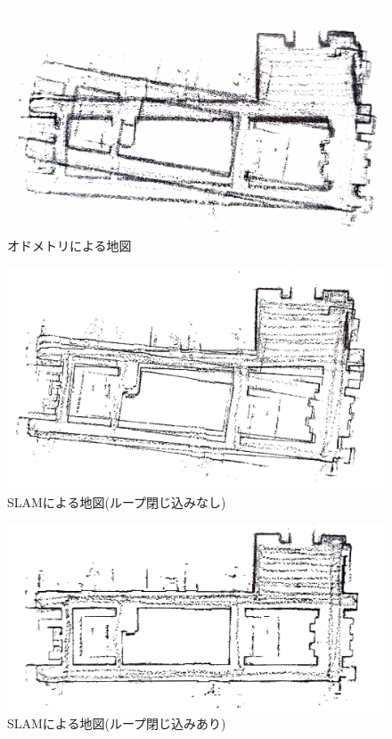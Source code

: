 \begin{figure}[h]
  \begin{center}
  \includegraphics[width=.8\linewidth]{img/slam_2.pdf}
  \caption{オドメトリによる地図}
  \label{slam:odometry}
  \end{center}
\end{figure}

\begin{figure}[h]
  \begin{center}
  \includegraphics[width=.8\linewidth]{img/slam_3.pdf}
  \caption{SLAMによる地図(ループ閉じ込みなし)}
  \label{slam:slam}
  \end{center}
\end{figure}

\begin{figure}[h]
  \begin{center}
  \includegraphics[width=.8\linewidth]{img/slam_4.pdf}
  \caption{SLAMによる地図(ループ閉じ込みあり)}
  \label{slam:slam_loop}
  \end{center}
\end{figure}

